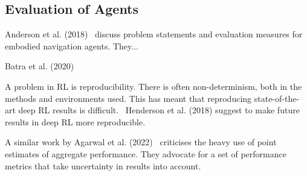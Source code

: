 

%


\subsection{Evaluation of Agents}

Anderson et al. (2018)~\cite{anderson_evaluation_2018} discuss problem statements and evaluation measures for embodied navigation agents.
They...

Batra et al. (2020)~\cite{batra_evaluation_2020}

A problem in RL is reproducibility.
There is often non-determinism, both in the methods and environments used.
This has meant that reproducing state-of-the-art deep RL results is difficult.~\cite{henderson_matters_2018}
Henderson et al. (2018) suggest to make future results in deep RL more reproducible.

A similar work by Agarwal et al. (2022)~\cite{agarwal_rlliable_2022} criticises the heavy use of point estimates of aggregate performance.
They advocate for a set of performance metrics that take uncertainty in results into account. 